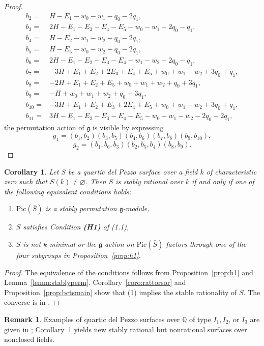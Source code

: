\documentclass[12pt, reqno]{amsart}
\theoremstyle{plain}
\newtheorem{coro}[prop]{Corollary}
\theoremstyle{remark}
\theoremstyle{definition}
\newtheorem{rema}[prop]{Remark}
\numberwithin{equation}{section}
\def\bQ{{\mathbb Q}}
\def\Pic{\mathrm{Pic}}
\begin{document}
\begin{proof}
\begin{align*}
b_2={}&
  H-E_1-w_0-w_1-q_0-2q_1,\\
b_3={}&
  2H-E_1-E_3-E_4-E_5-w_0-w_1-2q_0-q_1,\\
b_4={}&
  H-E_2-w_1-w_2-q_0-2q_1,\\
b_5={}&
  H-E_5-w_0-w_2-q_0-2q_1,\\
b_6={}&
  2H-E_1-E_2-E_3-E_4-w_1-w_2-2q_0-q_1,\\
b_7={}&
  -3H+E_1+E_2+2E_3+E_4+E_5
  +w_0+w_1+w_2+3q_0+q_1,\\
b_8={}&
  -2H+E_1+E_2+E_5
  +w_0+w_1+w_2+q_0+3q_1,\\
b_9={}&
  -H+w_0+w_1+w_2+q_0+3q_1,\\
b_{10}={}&
  -3H+E_1+E_2+E_3+2E_4+E_5
  +w_0+w_1+w_2+3q_0+q_1,\\
b_{11}={}&
  3H-E_1-E_2-E_3-E_4-E_5
  -w_0-w_1-w_2-2q_0-2q_1,
\end{align*}
the permutation action of $\mathfrak g$ is visible by expressing
$$
g_1=(b_1,b_2)(b_3,b_5)(b_4,b_6)
  (b_7,b_8)(b_9,b_{10}),
  $$
  $$
  g_2=(b_1,b_6,b_3)(b_2,b_5,b_4)(b_8,b_9).
$$
\end{proof}
\begin{coro}\label{coro:dp4stab}
    Let $S$ be a quartic del Pezzo surface over a field $k$ of characteristic zero such that $S(k)\ne \varnothing$. Then $S$ is stably rational over $k$ if and only if one of the following equivalent conditions holds:
    \begin{enumerate}
           \item $\Pic(\bar{S})$ is a stably permutation $\mathfrak g$-module,
           \item $S$ satisfies Condition {\bf(H1)} of (1.1),
\item $S$ is not $k$-minimal or the $\mathfrak g$-action on $\Pic(\bar{S})$ factors through one of the four subgroups in Proposition~\ref{prop:h1}.
     \end{enumerate}
\end{coro}
\begin{proof}
    The equivalence of the conditions follows from Proposition~\ref{prop:h1} and Lemma~\ref{lemm:stablyperm}. Corollary~\ref{coro:rattorsor} and Proposition~\ref{prop:bctsmain} show that (1) implies the stable rationality of $S$. The converse is in \cite{Maninperfect}.
\end{proof}

\begin{rema}
    Examples of quartic del Pezzo surfaces over $\bQ$ of type $I_1, I_2$, or $I_3$ are given in \cite[Theorem 6.15]{KSS}; 
    Corollary~\ref{coro:dp4stab} yields new  
    stably rational but nonrational surfaces over nonclosed fields. 
\end{rema}
\end{document}
